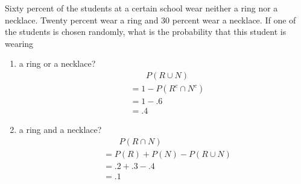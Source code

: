 \item Sixty percent of the students at a certain school wear neither a ring nor a necklace. Twenty percent wear a ring and 30 percent wear a necklace. If one of the students is chosen randomly, what is the probability that this student is wearing
\begin{enumerate}
    \item a ring or a necklace?
    \begin{align*}
        &\phantom{\;=\;} P(R\cup N)\\
        &= 1 - P(R^c\cap N^c)\\
        &= 1 - .6\\
        &= .4
    \end{align*}
    \item a ring and a necklace?
    \begin{align*}
        &\phantom{\;=\;} P(R\cap N)\\
        &= P(R) + P(N) - P(R \cup N)\\
        &= .2 + .3 - .4\\
        &= .1
    \end{align*}
\end{enumerate}